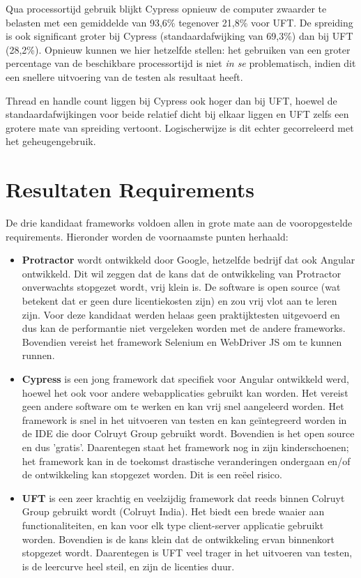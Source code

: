 Qua processortijd gebruik blijkt Cypress opnieuw de computer zwaarder te belasten met een gemiddelde van 93,6\% tegenover 21,8\% voor UFT. De spreiding is ook significant groter bij Cypress (standaardafwijking van 69,3\%) dan bij UFT (28,2\%). Opnieuw kunnen we hier hetzelfde stellen: het gebruiken van een groter percentage van de beschikbare processortijd is niet \emph{in se} problematisch, indien dit een snellere uitvoering van de testen als resultaat heeft.

Thread en handle count liggen bij Cypress ook hoger dan bij UFT, hoewel de standaardafwijkingen voor beide relatief dicht bij elkaar liggen en UFT zelfs een grotere mate van spreiding vertoont. Logischerwijze is dit echter gecorreleerd met het geheugengebruik.

\section{Resultaten Requirements}
\label{sec:resultaten-requirements}

De drie kandidaat frameworks voldoen allen in grote mate aan de vooropgestelde requirements. Hieronder worden de voornaamste punten herhaald:

\begin{itemize}
    \item \textbf{Protractor} wordt ontwikkeld door Google, hetzelfde bedrijf dat ook Angular ontwikkeld. Dit wil zeggen dat de kans dat de ontwikkeling van Protractor onverwachts stopgezet wordt, vrij klein is. De software is open source (wat betekent dat er geen dure licentiekosten zijn) en zou vrij vlot aan te leren zijn. Voor deze kandidaat werden helaas geen praktijktesten uitgevoerd en dus kan de performantie niet vergeleken worden met de andere frameworks. Bovendien vereist het framework Selenium en WebDriver JS om te kunnen runnen.
    \item \textbf{Cypress} is een jong framework dat specifiek voor Angular ontwikkeld werd, hoewel het ook voor andere webapplicaties gebruikt kan worden. Het vereist geen andere software om te werken en kan vrij snel aangeleerd worden. Het framework is snel in het uitvoeren van testen en kan geïntegreerd worden in de IDE die door Colruyt Group gebruikt wordt. Bovendien is het open source en dus 'gratis'. Daarentegen staat het framework nog in zijn kinderschoenen; het framework kan in de toekomst drastische veranderingen ondergaan en/of de ontwikkeling kan stopgezet worden. Dit is een reëel risico.
    \item \textbf{UFT} is een zeer krachtig en veelzijdig framework dat reeds binnen Colruyt Group gebruikt wordt (Colruyt India). Het biedt een brede waaier aan functionaliteiten, en kan voor elk type client-server applicatie gebruikt worden. Bovendien is de kans klein dat de ontwikkeling ervan binnenkort stopgezet wordt. Daarentegen is UFT veel trager in het uitvoeren van testen, is de leercurve heel steil, en zijn de licenties duur.
\end{itemize}
